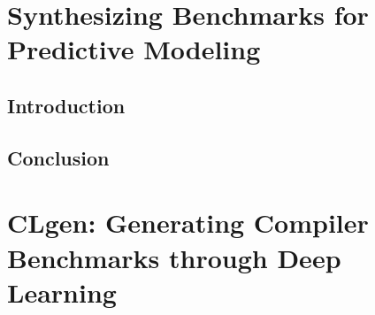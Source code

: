 \ifstapled
\chapter{Synthesizing Benchmarks for Predictive Modeling}
\section{Introduction}
\lipsum[1-2]

\section{Conclusion}
\lipsum[1-2]
\else
\chapter{CLgen: Generating Compiler Benchmarks through Deep Learning}









\fi